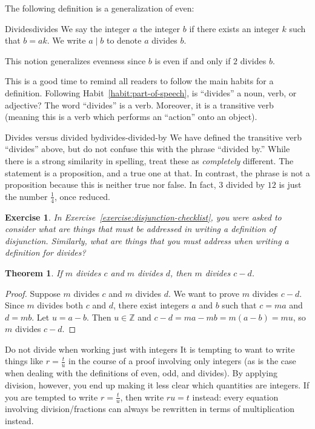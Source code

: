 \documentclass{book}
\newcounter{ekcounter}%
\theoremstyle{ekimcustom}
\newtheorem{theorem}[ekcounter]{Theorem}
\newtheorem{exercise}[ekcounter]{Exercise}
\newcommand\defn[1]{{\color{blue}{\bf #1}}}
\begin{document}
The following definition is a generalization of even:
\begin{bdefinition}{Divides}{divides}
We say the integer $a$ \defn{divides} the integer $b$ if there exists an integer $k$ such that $b=ak$. We write $a \mid b$ to denote $a$ divides $b$.
\end{bdefinition}
This notion generalizes evenness since $b$ is even if and only if $2$ divides $b$.
\begin{blanguage}{}{}
This is a good time to remind all readers to follow the main habits for a definition. Following Habit~\ref{habit:part-of-speech}, is ``divides'' a noun, verb, or adjective? The word ``divides'' is a verb. Moreover, it is a transitive verb (meaning this is a verb which performs an ``action'' onto an object).
\end{blanguage}
\begin{bwarning}{Divides versus divided by}{divides-divided-by}
We have defined the transitive verb ``divides'' above, but do not confuse this with the phrase ``divided by.'' While there is a strong similarity in spelling, treat these as \emph{completely} different. The statement  is a proposition, and a true one at that. In contrast, the phrase  is not a proposition because this is neither true nor false. In fact, $3$ divided by $12$ is just the number $\frac14$, once reduced.
\end{bwarning}

\begin{exercise}
In Exercise~\ref{exercise:disjunction-checklist}, you were asked to consider what are things that must be addressed in writing a definition of disjunction. Similarly, what are things that you must address when writing a definition for divides?
\end{exercise}

\begin{theorem}\label{theorem:divides-difference}
If $m$ divides $c$ and $m$ divides $d$, then $m$ divides $c-d$.
\end{theorem}
\begin{proof}
Suppose $m$ divides $c$ and $m$ divides $d$. We want to prove $m$ divides $c-d$. Since $m$ divides both $c$ and $d$, there exist integers $a$ and $b$ such that $c=ma$ and $d=mb$. Let $u=a-b$. Then $u \in \mathbb{Z}$ and $c-d=ma-mb=m(a-b)=mu$, so $m$ divides $c-d$.
\end{proof}

\begin{bwarning}{Do not divide when working just with integers}{}
It is tempting to want to write things like $r = \frac{t}{u}$ in the course of a proof involving only integers (as is the case when dealing with the definitions of even, odd, and divides). By applying division, however, you end up making it less clear which quantities are integers. If you are tempted to write $r =\frac{t}{u}$, then write $ru=t$ instead: every equation involving division/fractions can always be rewritten in terms of multiplication instead.
\end{bwarning}
\end{document}

